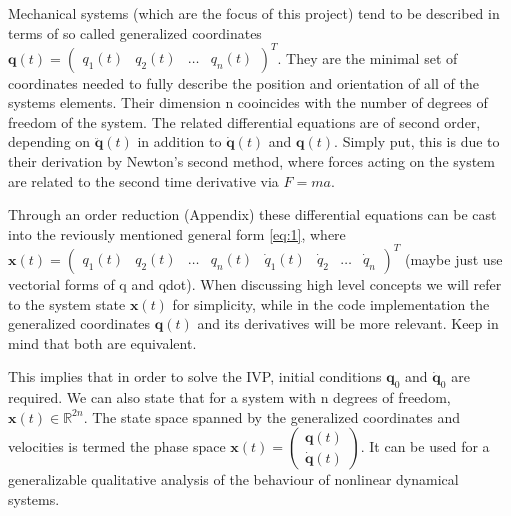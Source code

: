     Mechanical systems (which are the focus of this project) tend to be described in terms of so called generalized coordinates $\mathbf{q}(t)=\begin{pmatrix}q_1(t)&q_2(t)&\ldots&q_n(t) \end{pmatrix}^T$. They are the minimal set of coordinates needed to fully describe the position and orientation of all of the systems elements. Their dimension n cooincides with the number of degrees of freedom of the system. The related differential equations are of second order, depending on $\ddot{\mathbf{q}}(t)$ in addition to $\dot{\mathbf{q}}(t)$ and $\mathbf{q}(t)$. Simply put, this is due to their derivation by Newton's second method, where forces acting on the system are related to the second time derivative via $F = ma$. 


    Through an order reduction (Appendix) these differential equations can be cast into the reviously mentioned general form \ref{eq:1}, where $\mathbf{x}(t) = \begin{pmatrix}q_1(t)&q_2(t)&\ldots&q_n(t)&\dot{q}_1(t)&\dot{q}_2&\ldots&\dot{q}_n \end{pmatrix}^T$ (maybe just use vectorial forms of q and qdot).
    When discussing high level concepts we will refer to the system state $\mathbf{x}(t)$ for simplicity, while in the code implementation the generalized coordinates $\mathbf{q}(t)$ and its derivatives will be more relevant. Keep in mind that both are equivalent.

    This implies that in order to solve the IVP, initial conditions $\mathbf{q}_0$ and $\dot{\mathbf{q}}_0$ are required. We can also state that for a system with n degrees of freedom, $\mathbf{x}(t) \in \mathbb{R}^{2n}$. The state space spanned by the generalized coordinates and velocities is termed the phase space $\mathbf{x}(t) = \begin{pmatrix}\mathbf{q}(t)\\\dot{\mathbf{q}}(t)\end{pmatrix}$. It can be used for a generalizable qualitative analysis of the behaviour of nonlinear dynamical systems. 









